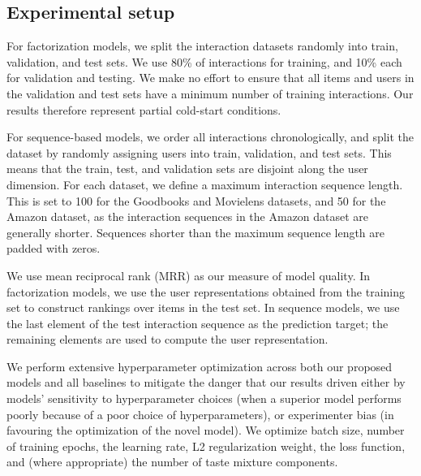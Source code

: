\documentclass[sigchi]{acmart}
\begin{document}
\subsection{Experimental setup}
For factorization models, we split the interaction datasets randomly into train, validation, and test sets. We use 80\% of interactions for training, and 10\% each for validation and testing. We make no effort to ensure that all items and users in the validation and test sets have a minimum number of training interactions. Our results therefore represent partial cold-start conditions.

For sequence-based models, we order all interactions chronologically, and split the dataset by randomly assigning users into train, validation, and test sets. This means that the train, test, and validation sets are disjoint along the user dimension. For each dataset, we define a maximum interaction sequence length. This is set to 100 for the Goodbooks and Movielens datasets, and 50 for the Amazon dataset, as the interaction sequences in the Amazon dataset are generally shorter. Sequences shorter than the maximum sequence length are padded with zeros.

We use mean reciprocal rank (MRR) as our measure of model quality. In factorization models, we use the user representations obtained from the training set to construct rankings over items in the test set. In sequence models, we use the last element of the test interaction sequence as the prediction target; the remaining elements are used to compute the user representation.

We perform extensive hyperparameter optimization across both our proposed models and all baselines to mitigate the danger that our results driven either by models' sensitivity to hyperparameter choices (when a superior model performs poorly because of a poor choice of hyperparameters), or experimenter bias (in favouring the optimization of the novel model). We optimize batch size, number of training epochs, the learning rate, L2 regularization weight, the loss function, and (where appropriate) the number of taste mixture components.
\end{document}
